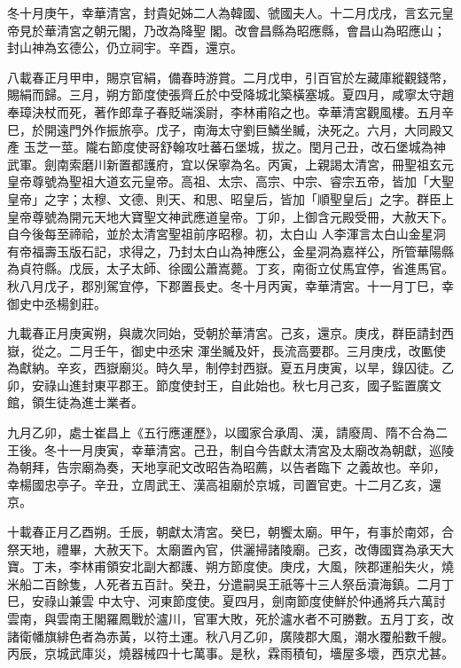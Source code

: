 \begin{pinyinscope}
 冬十月庚午，幸華清宮，封貴妃姊二人為韓國、虢國夫人。十二月戊戌，言玄元皇帝見於華清宮之朝元閣，乃改為降聖
 閣。改會昌縣為昭應縣，會昌山為昭應山；封山神為玄德公，仍立祠宇。辛酉，還京。



 八載春正月甲申，賜京官絹，備春時游賞。二月戊申，引百官於左藏庫縱觀錢幣，賜絹而歸。三月，朔方節度使張齊丘於中受降城北築橫塞城。夏四月，咸寧太守趙奉璋決杖而死，著作郎韋子春貶端溪尉，李林甫陷之也。幸華清宮觀風樓。五月辛巳，於開遠門外作振旅亭。戊子，南海太守劉巨鱗坐贓，決死之。六月，大同殿又產
 玉芝一莖。隴右節度使哥舒翰攻吐蕃石堡城，拔之。閏月己丑，改石堡城為神武軍。劍南索磨川新置都護府，宜以保寧為名。丙寅，上親謁太清宮，冊聖祖玄元皇帝尊號為聖祖大道玄元皇帝。高祖、太宗、高宗、中宗、睿宗五帝，皆加「大聖皇帝」之字；太穆、文德、則天、和思、昭皇后，皆加「順聖皇后」之字。群臣上皇帝尊號為開元天地大寶聖文神武應道皇帝。丁卯，上御含元殿受冊，大赦天下。自今後每至禘祫，並於太清宮聖祖前序昭穆。初，太白山
 人李渾言太白山金星洞有帝福壽玉版石記，求得之，乃封太白山為神應公，金星洞為嘉祥公，所管華陽縣為貞符縣。戊辰，太子太師、徐國公蕭嵩薨。丁亥，南衙立仗馬宜停，省進馬官。秋八月戊子，郡別駕宜停，下郡置長史。冬十月丙寅，幸華清宮。十一月丁巳，幸御史中丞楊釗莊。



 九載春正月庚寅朔，與歲次同始，受朝於華清宮。己亥，還京。庚戌，群臣請封西嶽，從之。二月壬午，御史中丞宋
 渾坐贓及奸，長流高要郡。三月庚戌，改匭使為獻納。辛亥，西嶽廟災。時久旱，制停封西嶽。夏五月庚寅，以旱，錄囚徒。乙卯，安祿山進封東平郡王。節度使封王，自此始也。秋七月己亥，國子監置廣文館，領生徒為進士業者。



 九月乙卯，處士崔昌上《五行應運歷》，以國家合承周、漢，請廢周、隋不合為二王後。冬十一月庚寅，幸華清宮。己丑，制自今告獻太清宮及太廟改為朝獻，巡陵為朝拜，告宗廟為奏，天地享祀文改昭告為昭薦，以告者臨下
 之義故也。辛卯，幸楊國忠亭子。辛丑，立周武王、漢高祖廟於京城，司置官吏。十二月乙亥，還京。



 十載春正月乙酉朔。壬辰，朝獻太清宮。癸巳，朝饗太廟。甲午，有事於南郊，合祭天地，禮畢，大赦天下。太廟置內官，供灑掃諸陵廟。己亥，改傳國寶為承天大寶。丁未，李林甫領安北副大都護、朔方節度使。庚戌，大風，陜郡運船失火，燒米船二百餘隻，人死者五百計。癸丑，分遣嗣吳王祇等十三人祭岳瀆海鎮。二月丁巳，安祿山兼雲
 中太守、河東節度使。夏四月，劍南節度使鮮於仲通將兵六萬討雲南，與雲南王閣羅鳳戰於瀘川，官軍大敗，死於瀘水者不可勝數。五月丁亥，改諸衛幡旗緋色者為赤黃，以符土運。秋八月乙卯，廣陵郡大風，潮水覆船數千艘。丙辰，京城武庫災，燒器械四十七萬事。是秋，霖雨積旬，墻屋多壞，西京尤甚。




\end{pinyinscope}
